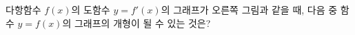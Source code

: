 \noindent\begin{minipage}[t]{0.58\linewidth}\vspace{0pt}\raggedright 다항함수 $f(x)$의 도함수 $y=f'(x)$의 그래프가 오른쪽 그림과 같을 때, 다음 중 함수 $y=f(x)$의 그래프의 개형이 될 수 있는 것은?\end{minipage}\hfill\begin{minipage}[t]{0.4\linewidth}\vspace{0pt}\centering \resizebox{\ifdim\width>\linewidth\linewidth\else\width\fi}{!}{}\end{minipage}\par
\par\smallskip\begin{center}\resizebox{\ifdim\width>\linewidth\linewidth\else\width\fi}{!}{}\end{center}
